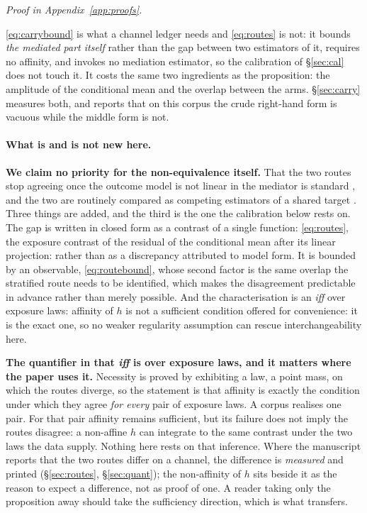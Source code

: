 \documentclass[11pt]{article}
\begin{document}
\noindent\emph{Proof in Appendix~\ref{app:proofs}.}

\noindent \eqref{eq:carrybound} is what a channel ledger needs and \eqref{eq:routes} is not: it bounds
\emph{the mediated part itself} rather than the gap between two estimators of it, requires no
affinity, and invokes no mediation estimator, so the calibration of \S\ref{sec:cal} does not touch
it. It costs the same two ingredients as the proposition: the amplitude of the conditional mean and
the overlap between the arms. \S\ref{sec:carry} measures both, and reports
that on this corpus the crude right-hand form is vacuous while the middle form is not.

\paragraph{What is and is not new here.} \textbf{We claim no priority for the non-equivalence
itself.} That the two routes stop agreeing once the outcome model is not linear in the mediator is
standard \citep{mackinnon2007mediation,vanderweele2015explanation}, and the two are routinely
compared as competing estimators of a shared target \citep{cheng2023product}. Three things are
added, and the third is the one the calibration below rests on. The gap is written in closed form
as a contrast of a single function: \eqref{eq:routes}, the exposure contrast of the residual of
the conditional mean after its linear projection: rather than as a discrepancy attributed to
model form. It is bounded by an observable, \eqref{eq:routebound}, whose second factor is the same overlap the
stratified route needs to be identified, which makes the disagreement predictable in advance rather
than merely possible. And the characterisation is an \emph{iff} over
exposure laws: affinity of $h$ is not a sufficient condition offered for convenience: it is the
exact one, so no weaker regularity assumption can rescue interchangeability here.

\textbf{The quantifier in that \emph{iff} is over exposure laws, and it matters where the paper
uses it.} Necessity is proved by exhibiting a law, a point mass, on which the routes diverge, so
the statement is that affinity is exactly the condition under which they agree \emph{for every}
pair of exposure laws. A corpus realises one pair. For that pair affinity remains sufficient, but its failure does not imply the routes disagree: a
non-affine $h$ can integrate to the same contrast under the two laws the data supply. Nothing here
rests on that inference. Where the
manuscript reports that the two routes differ on a channel, the difference is \emph{measured} and
printed (\S\ref{sec:routes}, \S\ref{sec:quant}); the non-affinity of $h$ sits beside it as the
reason to expect a difference, not as proof of one. A reader taking only the proposition away
should take the sufficiency direction, which is what transfers.
\end{document}
